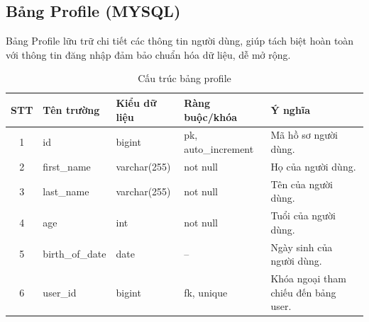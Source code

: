 \documentclass[../DoAn.tex]{subfiles}
\begin{document}
\subsection{Bảng Profile (MYSQL)}
Bảng Profile lữu trữ chi tiết các thông tin người dùng, giúp tách biệt hoàn toàn với thông tin đăng nhập đảm bảo chuẩn hóa dữ liệu, dễ mở rộng.
\begin{table}[htbp]
    \centering
    \small
    \renewcommand{\arraystretch}{1.3}
    \label{tab:profile-structure}
    \begin{tabularx}{\textwidth}{|c|l|l|l|>{\raggedright\arraybackslash}X|}
        \hline
        \textbf{STT} & \textbf{Tên trường} & \textbf{Kiểu dữ liệu} & \textbf{Ràng buộc/khóa} & \textbf{Ý nghĩa}                     \\
        \hline
        1            & id                  & bigint                & pk, auto\_increment     & Mã hồ sơ người dùng.                 \\
        \hline
        2            & first\_name         & varchar(255)          & not null                & Họ của người dùng.                   \\
        \hline
        3            & last\_name          & varchar(255)          & not null                & Tên của người dùng.                  \\
        \hline
        4            & age                 & int                   & not null                & Tuổi của người dùng.                 \\
        \hline
        5            & birth\_of\_date     & date                  & --                      & Ngày sinh của người dùng.            \\
        \hline
        6            & user\_id            & bigint                & fk, unique              & Khóa ngoại tham chiếu đến bảng user. \\
        \hline
    \end{tabularx}
    \caption{Cấu trúc bảng profile}
\end{table}
\end{document}
